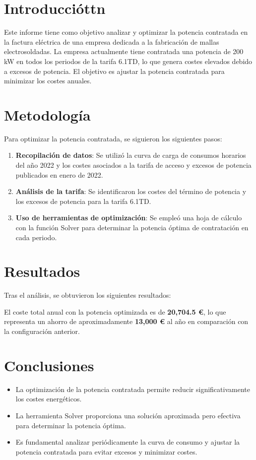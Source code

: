 \documentclass[a4paper,10pt,twocolumn]{article}
\begin{document}
\begin{Form}
\section{Introduccióttn}
Este informe tiene como objetivo analizar y optimizar la potencia contratada en la factura eléctrica de una empresa dedicada a la fabricación de mallas electrosoldadas. La empresa actualmente tiene contratada una potencia de 200 kW en todos los periodos de la tarifa 6.1TD, lo que genera costes elevados debido a excesos de potencia. El objetivo es ajustar la potencia contratada para minimizar los costes anuales.

\section{Metodología}
Para optimizar la potencia contratada, se siguieron los siguientes pasos:

\begin{enumerate}
    \item \textbf{Recopilación de datos}: Se utilizó la curva de carga de consumos horarios del año 2022 y los costes asociados a la tarifa de acceso y excesos de potencia publicados en enero de 2022.
    \item \textbf{Análisis de la tarifa}: Se identificaron los costes del término de potencia y los excesos de potencia para la tarifa 6.1TD.
    \item \textbf{Uso de herramientas de optimización}: Se empleó una hoja de cálculo con la función Solver para determinar la potencia óptima de contratación en cada periodo.
\end{enumerate}

\section{Resultados}
Tras el análisis, se obtuvieron los siguientes resultados:



El coste total anual con la potencia optimizada es de \textbf{20,704.5 €}, lo que representa un ahorro de aproximadamente \textbf{13,000 €} al año en comparación con la configuración anterior.

\section{Conclusiones}
\begin{itemize}
    \item La optimización de la potencia contratada permite reducir significativamente los costes energéticos.
    \item La herramienta Solver proporciona una solución aproximada pero efectiva para determinar la potencia óptima.
    \item Es fundamental analizar periódicamente la curva de consumo y ajustar la potencia contratada para evitar excesos y minimizar costes.
\end{itemize}


\end{Form}
\end{document}
